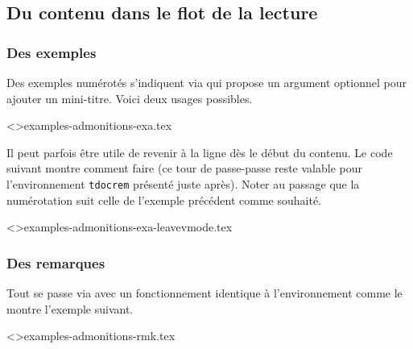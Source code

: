 \subsection{Du contenu dans le flot de la lecture}




\subsubsection{Des exemples}

Des exemples numérotés s'indiquent via  qui propose un argument optionnel pour ajouter un mini-titre.
Voici deux usages possibles.

\tdoclatexinput<>{examples-admonitions-exa.tex}


\begin{tdoctip}
    Il peut parfois être utile de revenir à la ligne dès le début du contenu. Le code suivant montre comment faire (ce tour de passe-passe reste valable pour l'environnement \verb#tdocrem# présenté juste après). Noter au passage que la numérotation suit celle de l'exemple précédent comme souhaité.
\end{tdoctip}

\tdoclatexinput<>{examples-admonitions-exa-leavevmode.tex}



\subsubsection{Des remarques}

Tout se passe via  avec un fonctionnement identique à l'environnement  comme le montre l'exemple suivant.


\tdoclatexinput<>{examples-admonitions-rmk.tex}


